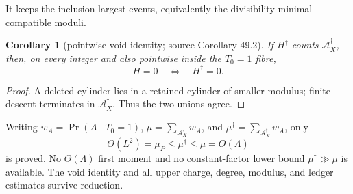 \documentclass[10pt,reqno]{amsart}
\newtheorem{corollary}[theorem]{Corollary}
\theoremstyle{definition}
\newcommand{\1}{\mathbf 1}
\begin{document}
It keeps the inclusion-largest events, equivalently the
divisibility-minimal compatible moduli.
\begin{corollary}[pointwise void identity; source Corollary 49.2]
\label{cor:antichain-void}
If $H^\dagger$ counts $\mathcal A_X^\dagger$, then, on every integer and
also pointwise inside the $T_0=1$ fibre,
\begin{equation}\tag{49.5}
 H=0\quad\Longleftrightarrow\quad H^\dagger=0.
\end{equation}
\end{corollary}
\begin{proof}
A deleted cylinder lies in a retained cylinder of smaller modulus; finite
descent terminates in $\mathcal A_X^\dagger$.  Thus the two unions agree.
\end{proof}
Writing $w_A=\Pr(A\mid T_0=1)$, $\mu=\sum_{\mathcal A_X^\circ}w_A$,
and $\mu^\dagger=\sum_{\mathcal A_X^\dagger}w_A$, only
\begin{equation}\tag{49.6}
 \Theta(L^2)=\mu_P\leq\mu^\dagger\leq\mu=O(\Lambda)
\end{equation}
is proved.  No $\Theta(\Lambda)$ first moment and no constant-factor lower
bound $\mu^\dagger\gg\mu$ is available.  The void identity and all upper
charge, degree, modulus, and ledger estimates survive reduction.
\end{document}
